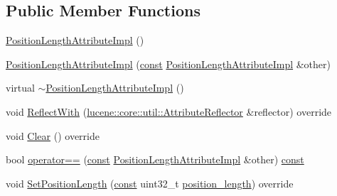 \subsection*{Public Member Functions}
\begin{DoxyCompactItemize}
\item 
\mbox{\hyperlink{classlucene_1_1core_1_1analysis_1_1tokenattributes_1_1PositionLengthAttributeImpl_afcfe707b9309054f29ab710a3414a20b}{Position\+Length\+Attribute\+Impl}} ()
\item 
\mbox{\hyperlink{classlucene_1_1core_1_1analysis_1_1tokenattributes_1_1PositionLengthAttributeImpl_a2ed9d880e9632a2e444b62a1c127e713}{Position\+Length\+Attribute\+Impl}} (\mbox{\hyperlink{ZlibCrc32_8h_a2c212835823e3c54a8ab6d95c652660e}{const}} \mbox{\hyperlink{classlucene_1_1core_1_1analysis_1_1tokenattributes_1_1PositionLengthAttributeImpl}{Position\+Length\+Attribute\+Impl}} \&other)
\item 
virtual \mbox{\hyperlink{classlucene_1_1core_1_1analysis_1_1tokenattributes_1_1PositionLengthAttributeImpl_ab0cf2e31a5d40ad16b987d424344e94d}{$\sim$\+Position\+Length\+Attribute\+Impl}} ()
\item 
void \mbox{\hyperlink{classlucene_1_1core_1_1analysis_1_1tokenattributes_1_1PositionLengthAttributeImpl_aec63a5cf6bdf55b0f4c95d5b17109e5f}{Reflect\+With}} (\mbox{\hyperlink{namespacelucene_1_1core_1_1util_a7dbb701adaed055f73fb95eec83da10a}{lucene\+::core\+::util\+::\+Attribute\+Reflector}} \&reflector) override
\item 
void \mbox{\hyperlink{classlucene_1_1core_1_1analysis_1_1tokenattributes_1_1PositionLengthAttributeImpl_a0f4a9a4b9ab64ced895b8fa5b9983cbd}{Clear}} () override
\item 
bool \mbox{\hyperlink{classlucene_1_1core_1_1analysis_1_1tokenattributes_1_1PositionLengthAttributeImpl_a037d4fab2158faa6e923e78b730d0f4a}{operator==}} (\mbox{\hyperlink{ZlibCrc32_8h_a2c212835823e3c54a8ab6d95c652660e}{const}} \mbox{\hyperlink{classlucene_1_1core_1_1analysis_1_1tokenattributes_1_1PositionLengthAttributeImpl}{Position\+Length\+Attribute\+Impl}} \&other) \mbox{\hyperlink{ZlibCrc32_8h_a2c212835823e3c54a8ab6d95c652660e}{const}}
\item 
void \mbox{\hyperlink{classlucene_1_1core_1_1analysis_1_1tokenattributes_1_1PositionLengthAttributeImpl_a8b09235c697cf5157ca4351653fcbaf4}{Set\+Position\+Length}} (\mbox{\hyperlink{ZlibCrc32_8h_a2c212835823e3c54a8ab6d95c652660e}{const}} uint32\+\_\+t \mbox{\hyperlink{classlucene_1_1core_1_1analysis_1_1tokenattributes_1_1PositionLengthAttributeImpl_a12c90fb7e49f9b4043bfc09d66ef816d}{position\+\_\+length}}) override

\end{DoxyCompactItemize}
